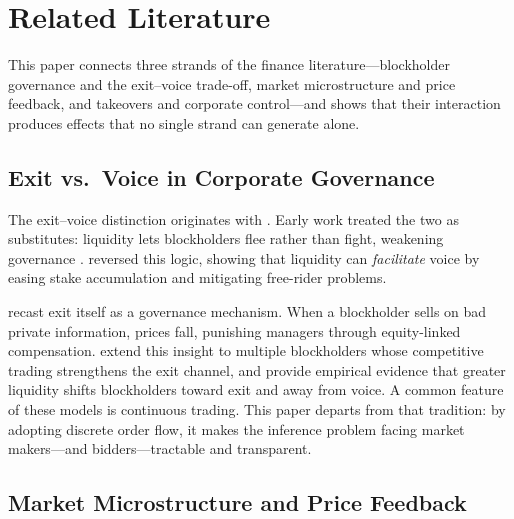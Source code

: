 \section{Related Literature}
\label{sec:lit}

This paper connects three strands of the finance literature---blockholder governance and the exit--voice trade-off, market microstructure and price feedback, and takeovers and corporate control---and shows that their interaction produces effects that no single strand can generate alone.

\subsection{Exit vs.\ Voice in Corporate Governance}

The exit--voice distinction originates with \citet{Hirschman1970}. Early work treated the two as substitutes: liquidity lets blockholders flee rather than fight, weakening governance \citep{Coffee1991,Bhide1993}. \citet{Maug1998} reversed this logic, showing that liquidity can \emph{facilitate} voice by easing stake accumulation and mitigating free-rider problems.

\citet{Edmans2009} recast exit itself as a governance mechanism. When a blockholder sells on bad private information, prices fall, punishing managers through equity-linked compensation. \citet{EdmansManso2011} extend this insight to multiple blockholders whose competitive trading strengthens the exit channel, and \citet{EdmansFangZur2013} provide empirical evidence that greater liquidity shifts blockholders toward exit and away from voice. A common feature of these models is continuous trading. This paper departs from that tradition: by adopting discrete order flow, it makes the inference problem facing market makers---and bidders---tractable and transparent.

\subsection{Market Microstructure and Price Feedback}


